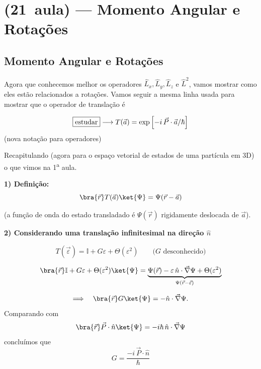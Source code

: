 \section*{(21\textordfeminine\ aula) --- Momento Angular e Rotações}

\subsection*{Momento Angular e Rotações}

Agora que conhecemos melhor os operadores $\hat{L}_x, \hat{L}_y, \hat{L}_z$ e $\hat{L}^2$, vamos mostrar como eles estão relacionados a rotações. Vamos seguir a mesma linha usada para mostrar que o operador de translação é

\begin{equation}
    \fbox{estudar} \longrightarrow T(\vec{a}) = \exp\left[-i\,\vec{P}\cdot\vec{a}/\hbar\right]
\label{eq:aula21_T_def}
\end{equation}
(nova notação para operadores)

Recapitulando (agora para o espaço vetorial de estados de uma partícula em 3D) o que vimos na 1\textsuperscript{a} aula.

\textbf{1) Definição:}
\begin{equation}
    \bra{\vec{r}} T(\vec{a}) \ket{\Psi} = \Psi(\vec{r} - \vec{a})
\label{eq:aula21_T_def_acao}
\end{equation}

(a função de onda do estado transladado é $\Psi(\vec{r})$ rigidamente deslocada de $\vec{a}$).

\textbf{2) Considerando uma translação infinitesimal na direção $\hat{n}$}

\begin{equation}
    T(\vec{\varepsilon}) = \mathbb{I} + G\varepsilon + \Theta(\varepsilon^2) \qquad \text{($G$ desconhecido)}
\label{eq:aula21_T_infinitesimal}
\end{equation}

\begin{equation}
    \bra{\vec{r}} \mathbb{I} + G\varepsilon + \Theta(\varepsilon^2) \ket{\Psi} = \underbrace{\Psi(\vec{r}) - \varepsilon\,\hat{n}\cdot\vec{\nabla}\Psi + \Theta(\varepsilon^2)}_{\Psi(\vec{r}-\vec{\varepsilon})}
\label{eq:aula21_T_infinitesimal_acao}
\end{equation}

\begin{equation}
    \Longrightarrow \quad \bra{\vec{r}} G \ket{\Psi} = -\hat{n}\cdot\vec{\nabla}\Psi.
\label{eq:aula21_G_acao}
\end{equation}
Comparando com
\begin{equation}
    \bra{\vec{r}} \vec{P}\cdot\hat{n} \ket{\Psi} = -i\hbar\,\hat{n}\cdot\vec{\nabla}\Psi
\label{eq:aula21_P_acao}
\end{equation}
concluímos que
\begin{equation}
    \boxed{G = \frac{-i\,\vec{P}\cdot\hat{n}}{\hbar}}
\label{eq:aula21_G_resultado}
\end{equation}

